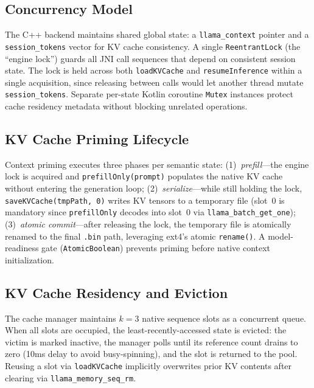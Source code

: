 \documentclass[journal]{IEEEtran}
\begin{document}
\subsection{Concurrency Model}
\label{sec:concurrency}

The C++ backend maintains shared global state: a \texttt{llama\_context} pointer and a \texttt{session\_tokens} vector for KV cache consistency. A single \texttt{ReentrantLock} (the ``engine lock'') guards all JNI call sequences that depend on consistent session state. The lock is held across both \texttt{loadKVCache} and \texttt{resumeInference} within a single acquisition, since releasing between calls would let another thread mutate \texttt{session\_tokens}. Separate per-state Kotlin coroutine \texttt{Mutex} instances protect cache residency metadata without blocking unrelated operations.

\subsection{KV Cache Priming Lifecycle}
\label{sec:priming}

Context priming executes three phases per semantic state: (1)~\emph{prefill}---the engine lock is acquired and \texttt{prefillOnly(prompt)} populates the native KV cache without entering the generation loop; (2)~\emph{serialize}---while still holding the lock, \texttt{saveKVCache(tmpPath, 0)} writes KV tensors to a temporary file (slot~0 is mandatory since \texttt{prefillOnly} decodes into slot~0 via \texttt{llama\_batch\_get\_one}); (3)~\emph{atomic commit}---after releasing the lock, the temporary file is atomically renamed to the final \texttt{.bin} path, leveraging ext4's atomic \texttt{rename()}. A model-readiness gate (\texttt{AtomicBoolean}) prevents priming before native context initialization.

\subsection{KV Cache Residency and Eviction}
\label{sec:eviction}

The cache manager maintains $k = 3$ native sequence slots as a concurrent queue. When all slots are occupied, the least-recently-accessed state is evicted: the victim is marked inactive, the manager polls until its reference count drains to zero (10ms delay to avoid busy-spinning), and the slot is returned to the pool. Reusing a slot via \texttt{loadKVCache} implicitly overwrites prior KV contents after clearing via \texttt{llama\_memory\_seq\_rm}.
\end{document}
